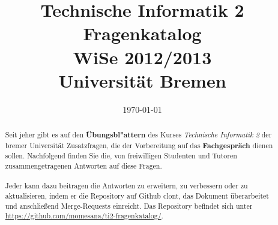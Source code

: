 \documentclass[12pt,a4paper,ngerman]{scrartcl}
\title{Technische Informatik 2 \\ Fragenkatalog \\ WiSe 2012/2013 \\[5pt] \Large{Universität Bremen}}
\date{\today}
\makeatletter
\newcommand{\question}[1]{
	\subsection[\truncate{0.80\textwidth}{#1}]{
	\textcolor{blue}{#1}}}
\newenvironment{multilinequestion}[1][]
	{\subsection[\truncate{0.80\textwidth}{#1}]{\textcolor{blue}{#1}} \color{blue}}
	{}
\newlength\RightBarWidth
\newenvironment{rightbar}
	{
	\def\FrameCommand##1{%
	\hspace{\textwidth}\hspace{-\RightBarWidth}%
	{\color{dkgreen}\vrule width \RightBarWidth}
	\hspace{-\textwidth}##1\hfill}%
	\MakeFramed{\addtolength\hsize{-\width-\RightBarWidth-\columnsep}%
	\FrameRestore}%
	}
	{\endMakeFramed}
\newcommand\mystuff@footnotebuffer{}
\newcounter{mystuff@footnote}
\newcommand\bufferfootnotes{
	\let\mystuff@footnoteold\footnote
	\setcounter{mystuff@footnote}{\thefootnote}
	\renewcommand\mystuff@footnotebuffer{}
	\renewcommand{\footnote}[1]{
		\footnotemark
		\g@addto@macro{\mystuff@footnotebuffer}{
			\stepcounter{mystuff@footnote}
			\protect\footnotetext[\themystuff@footnote]{##1}
		}
	}
}
\newcommand\stopbufferingfootnotes{%
	\mystuff@footnotebuffer%
	\renewcommand{\footnote}[1]{\mystuff@footnoteold{##1}}%
}
\newenvironment {answer}
                {\bufferfootnotes\begin{rightbar} }
                {\end{rightbar}\stopbufferingfootnotes}
\makeatother
\begin{document}
\maketitle

\begin{abstract}
Seit jeher gibt es auf den \textbf{Übungsbl"attern} des Kurses \textit{Technische Informatik 2} der bremer Universität Zusatzfragen, die der Vorbereitung auf das \textbf{Fachgespräch} dienen sollen. Nachfolgend finden Sie die, von freiwilligen Studenten und Tutoren zusammengetragenen Antworten auf diese Fragen.

\paragraph*{}
Jeder kann dazu beitragen die Antworten zu erweitern, zu verbessern oder zu aktualisieren, indem er die Repository auf Github clont, das Dokument überarbeitet und anschließend Merge-Requests einreicht. Das Repository befindet sich unter  \url{https://github.com/momesana/ti2-fragenkatalog/}.
\end{abstract}

\newpage

\tableofcontents 

%
%








\end{document}
